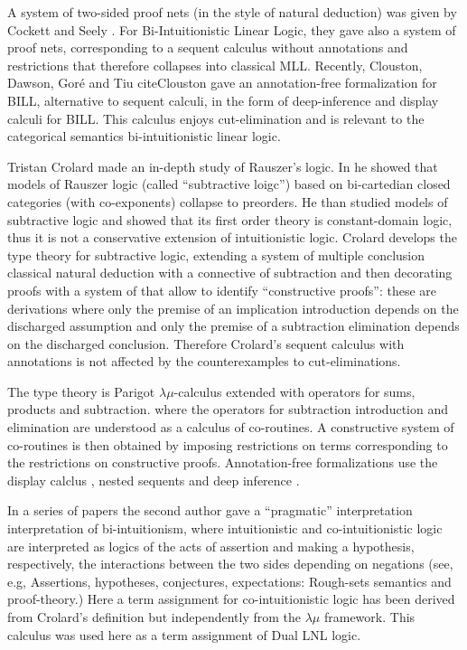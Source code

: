 A system of two-sided proof nets (in the style of natural deduction) was given by Cockett and Seely \cite{Cockett:1997}.
For Bi-Intuitionistic Linear Logic, they gave also a system of proof nets, corresponding to a sequent calculus without 
annotations and restrictions that therefore collapses into classical MLL. 
Recently, Clouston, Dawson, Goré and Tiu cite{Clouston} gave an annotation-free formalization for BILL, alternative to sequent calculi, in the form of deep-inference and display calculi for BILL. This calculus enjoys cut-elimination and is 
relevant to the categorical semantics bi-intuitionistic linear logic.
 
Tristan Crolard \cite{Crolard:2001,Crolard:2004} made an in-depth study of Rauszer's logic. In \cite{Crolard:2001} he showed that models of Rauszer logic (called ``subtractive loigc'') based on bi-cartedian closed categories (with co-exponents) collapse to preorders.
He than studied models of subtractive logic and showed that its first order theory is constant-domain logic, thus it is not 
a conservative extension of intuitionistic logic.
Crolard \cite{Crolard:2004} develops the type theory for subtractive logic, extending a system of multiple conclusion
classical natural deduction with a connective of subtraction and then decorating proofs with a system of \cite{annotations
of dependencies} that allow to identify ``constructive proofs'': these are derivations where only the premise of an implication introduction depends on the discharged assumption and only the premise of a subtraction elimination depends on the discharged conclusion. Therefore Crolard's sequent calculus with annotations is not affected by the 
counterexamples to cut-eliminations. 

The type theory is Parigot $\lambda\mu$-calculus extended with operators for sums, products and subtraction. 
where the operators for subtraction introduction and elimination are understood as a calculus of co-routines.
A constructive system of co-routines is then obtained by imposing restrictions on terms corresponding to the restrictions
 on constructive proofs.  Annotation-free formalizations use the display calclus \cite{Gore:2000}, nested sequents
\cite{GorePostnieceTiu:2008} and deep inference \cite{Postniece:2009}.

In a series of papers the second author gave a ``pragmatic'' interpretation interpretation of bi-intuitionism, where intuitionistic and co-intuitionistic logic are interpreted as logics of the acts of assertion and making a hypothesis, 
respectively, the interactions between the two sides depending on negations (see, e.g, \cite{Bellin:2014} 
Assertions, hypotheses, conjectures, expectations: Rough-sets semantics and proof-theory.)
Here a term assignment for co-intuitionistic logic has been derived from Crolard's definition but independently 
from the $\lambda\mu$ framework. This calculus was used here as a term assignment of Dual LNL logic.  


